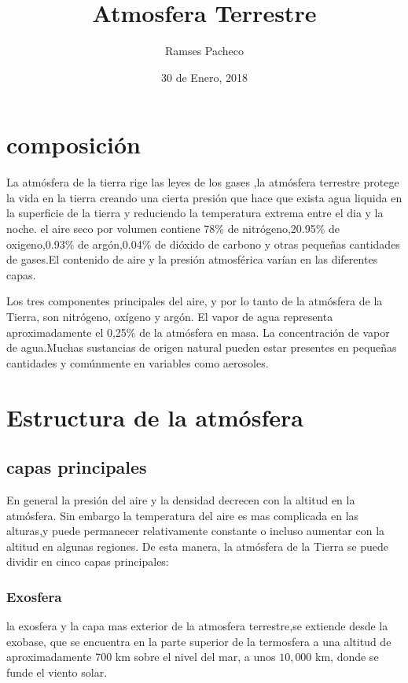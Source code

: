 \documentclass{article} %
\title{Atmosfera Terrestre}
\author{Ramses Pacheco}
\date{30 de Enero, 2018}
\begin{document}
\maketitle %

\section{composición}

La atmósfera de la tierra  rige las leyes de los gases ,la atmósfera terrestre protege la vida en la tierra creando una cierta presión que hace que exista agua liquida en la superficie de la tierra y reduciendo la temperatura extrema entre el dia y la noche.
el aire seco por volumen contiene 78\% de nitrógeno,20.95\% de oxigeno,0.93\% de argón,0.04\% de dióxido de carbono y otras pequeñas cantidades de gases.El contenido de aire y la presión atmosférica varían en las diferentes capas.

Los tres componentes principales del aire, y por lo tanto de la atmósfera de la Tierra, son nitrógeno, oxígeno y argón. El vapor de agua representa aproximadamente el 0,25\% de la atmósfera en masa. La concentración de vapor de agua.Muchas sustancias de origen natural pueden estar presentes en pequeñas cantidades y comúnmente en variables como aerosoles.

\section{Estructura de la atmósfera}
\subsection{capas principales}

En general la presión del aire y la densidad decrecen con la altitud en la atmósfera. Sin embargo la temperatura del aire es mas complicada en las alturas,y puede permanecer relativamente constante o incluso aumentar con la altitud en algunas regiones. De esta manera, la atmósfera de la Tierra se puede dividir en cinco capas principales:

\subsubsection{Exosfera}
la exosfera y la capa mas exterior de la atmosfera terrestre,se extiende desde la exobase, que se encuentra en la parte superior de la termosfera a una altitud de aproximadamente 700 km sobre el nivel del mar, a unos $10,000$ km, donde se funde el viento solar.
\end{document}
